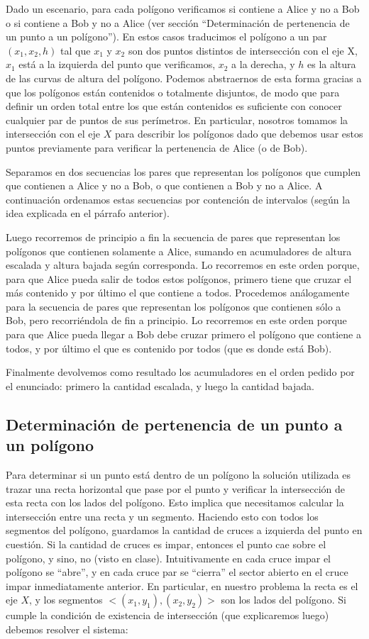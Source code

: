 Dado un escenario, para cada polígono verificamos si contiene a Alice y
no a Bob o si contiene a Bob y no a Alice (ver sección ``Determinación
de pertenencia de un punto a un polígono''). En estos casos traducimos
el polígono a un par $(x_1, x_2, h)$ tal que $x_1$ y $x_2$ son dos puntos
distintos de intersección con el eje X, $x_1$ está a la izquierda del punto
que verificamos, $x_2$ a la derecha, y $h$ es la altura de las curvas de altura
del polígono. Podemos abstraernos de esta forma gracias a que los polígonos
están contenidos o totalmente disjuntos, de modo que para definir un orden
total entre los que están contenidos es suficiente con conocer cualquier par de
puntos de sus perímetros. En particular, nosotros tomamos la intersección
con el eje $X$ para describir los polígonos dado que debemos usar estos
puntos previamente para verificar la pertenencia de Alice (o de Bob).

Separamos en dos secuencias los pares que representan los polígonos que
cumplen que contienen a Alice y no a Bob, o que contienen a Bob y no a Alice. A
continuación ordenamos estas secuencias por contención de intervalos
(según la idea explicada en el párrafo anterior).

Luego recorremos de principio a fin la secuencia de pares que representan los
polígonos que contienen solamente a Alice, sumando en acumuladores de altura
escalada y altura bajada según corresponda. Lo recorremos en este orden
porque, para que Alice pueda salir de todos estos polígonos, primero tiene que
cruzar el más contenido y por último el que contiene a todos. Procedemos
análogamente para la secuencia de pares que representan los polígonos que
contienen sólo a Bob, pero recorriéndola de fin a principio. Lo recorremos
en este orden porque para que Alice pueda llegar a Bob debe cruzar primero el
polígono que contiene a todos, y por último el que es contenido por todos
(que es donde está Bob).

Finalmente devolvemos como resultado los acumuladores en el orden pedido
por el enunciado: primero la cantidad escalada, y luego la cantidad bajada.

\subsection*{Determinación de pertenencia de un punto a un polígono}

Para determinar si un punto está dentro de un polígono la solución utilizada es trazar una recta horizontal
que pase por el punto y verificar la intersección de esta recta con los lados del polígono. Esto implica
que necesitamos calcular la intersección entre una recta y un segmento.
Haciendo esto con todos los segmentos del polígono, guardamos la cantidad de cruces a izquierda del punto
en cuestión. Si la cantidad de cruces es impar, entonces el punto cae sobre el polígono, y sino, no (visto en
clase). Intuitivamente en cada cruce impar el polígono se ``abre'', y en cada cruce par se
``cierra'' el sector abierto en el cruce impar inmediatamente anterior.
En particular, en nuestro problema la recta es el eje $X$, y los segmentos $<(x_1,y_1), (x_2,y_2)>$ son
los lados del polígono. Si cumple la condición de existencia de intersección (que explicaremos luego)
debemos resolver el sistema:


